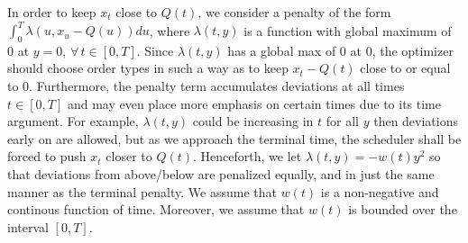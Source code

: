 \documentclass[12pt, letterpaper]{article}
\numberwithin{equation}{section}
\numberwithin{theorem}{section}
\begin{document}

In order to keep $x_t$ close to $Q(t)$, we consider a penalty of the form  $\int_0^T\lambda\left(u,x_u-Q(u)\right)du$, where $\lambda(t,y)$  is a function with global maximum of 0 at $y=0$, $\forall\,t\in[0,T]$. Since $\lambda(t,y)$ has a global max of 0 at 0, the optimizer should choose order types in such a way as to keep $x_t-Q(t)$ close to or equal to 0. Furthermore, the penalty term accumulates deviations at all times $t\in[0,T]$ and may even place more emphasis on certain times due to its time argument. For example, $\lambda(t,y)$ could be increasing in $t$ for all $y$ then deviations early on are allowed, but as we approach the terminal time, the scheduler shall be forced to push $x_t$ closer to $Q(t)$. Henceforth, we let  $\lambda(t,y)=-w(t)y^2$ so that deviations from above/below are penalized equally, and in just the same manner as the terminal penalty. We assume that $w(t)$ is a non-negative and continous function of time. Moreover, we assume that $w(t)$ is bounded over the interval $[0,T].$

\end{document}

